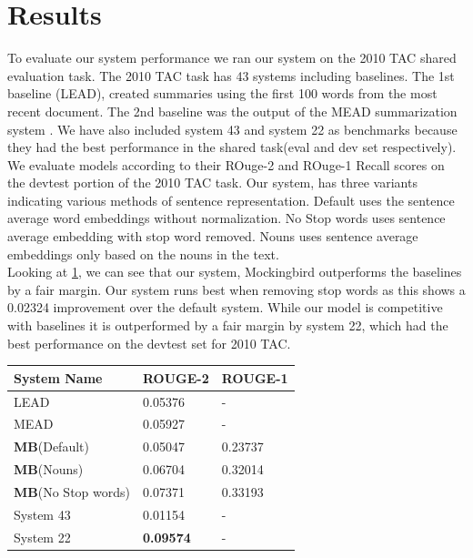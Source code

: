 \documentclass[11pt,a4paper]{article}
\begin{document}
\section{Results}
To evaluate our system performance we ran our system on the 2010 TAC shared evaluation task. The 2010 TAC task has 43 systems including baselines. The 1st baseline (LEAD), created summaries using the first 100 words from the most recent document. The 2nd baseline was the output of the MEAD summarization system \cite{Radev2003MEADRM}. We have also included system 43 and system 22 as benchmarks because they had the best performance in the shared task(eval and dev set respectively). We evaluate models according to their ROuge-2 and ROuge-1 Recall scores on the devtest portion of the 2010 TAC task. Our system, has three variants indicating various methods of sentence representation. Default uses the sentence average word embeddings without normalization. No Stop words uses sentence average embedding with stop word removed. Nouns uses sentence average embeddings only based on the nouns in the text. \\
Looking at \ref{table:1}, we can see that our system, Mockingbird outperforms the baselines by a fair margin. Our system runs best when removing stop words as this shows a 0.02324 improvement over the default system. While our model is competitive with baselines it is outperformed by a fair margin by system 22, which had the best performance on the devtest set for 2010 TAC. 
\begin{table}[h]
\begin{tabular}{|l|l|l|} \hline
\textbf{System Name} & \textbf{ROUGE-2} & \textbf{ROUGE-1}\\ \hline
LEAD & 0.05376 & - \\ \hline
MEAD & 0.05927 &  -\\ \hline
\textbf{MB}(Default) &  0.05047 & 0.23737 \\ \hline
\textbf{MB}(Nouns) & 0.06704  &  0.32014\\ \hline
\textbf{MB}(No Stop words) & 0.07371 & 0.33193 \\ \hline
System 43 & 0.01154 & -\\ \hline
System 22 & \textbf{0.09574} & - \\ \hline
\end{tabular}
\label{table:1}
\end{table}
\end{document}
